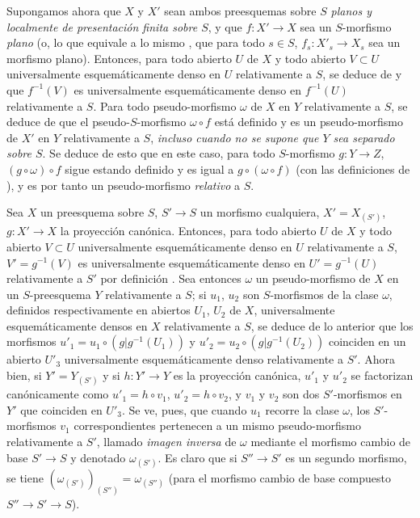 \begin{env}[20.5.7]
\label{IV.20.5.7}
Supongamos ahora que $X$ y $X'$ sean ambos preesquemas sobre $S$ \emph{planos y localmente de presentación finita sobre $S$}, y que $f:X'\to X$ sea un $S$-morfismo \emph{plano} (o, lo que equivale a lo mismo , que para todo $s\in S$, $f_s:X'_s\to X_s$ sea un morfismo plano).
Entonces, para todo abierto $U$ de $X$ y todo abierto $V\subset U$ universalmente esquemáticamente denso en $U$ relativamente a $S$, se deduce de  y  que $f^{-1}(V)$ es universalmente esquemáticamente denso en $f^{-1}(U)$ relativamente a $S$.
Para todo pseudo-morfismo $\omega$ de $X$ en $Y$ relativamente a $S$, se deduce de  que el pseudo-$S$-morfismo $\omega\circ f$ está definido y es un pseudo-morfismo de $X'$ en $Y$ relativamente a $S$, \emph{incluso cuando no se supone que $Y$ sea separado sobre $S$}.
Se deduce de esto que en este caso, para todo $S$-morfismo $g:Y\to Z$, $(g\circ\omega)\circ f$ sigue estando definido y es igual a $g\circ(\omega\circ f)$ (con las definiciones de ), y es por tanto un pseudo-morfismo \emph{relativo} a $S$.
\end{env}

\begin{env}[20.5.8]
\label{IV.20.5.8}
Sea $X$ un preesquema sobre $S$, $S'\to S$ un morfismo cualquiera, $X'=X_{(S')}$, $g:X'\to X$ la proyección canónica.
Entonces, para todo abierto $U$ de $X$ y todo abierto $V\subset U$ universalmente esquemáticamente denso en $U$ relativamente a $S$, $V'=g^{-1}(V)$ es universalmente esquemáticamente denso en $U'=g^{-1}(U)$ relativamente a $S'$ por definición .
Sea entonces $\omega$ un pseudo-morfismo de $X$ en un $S$-preesquema $Y$ relativamente a $S$; si $u_1$, $u_2$ son $S$-morfismos de la clase $\omega$, definidos respectivamente en abiertos $U_1$, $U_2$ de $X$, universalmente esquemáticamente densos en $X$ relativamente a $S$, se deduce de lo anterior que los morfismos $u'_1=u_1\circ(g|g^{-1}(U_1))$ y $u'_2=u_2\circ(g|g^{-1}(U_2))$ coinciden en un abierto $U'_3$ universalmente esquemáticamente denso relativamente a $S'$.
Ahora bien, si $Y'=Y_{(S')}$ y si $h:Y'\to Y$ es la proyección canónica, $u'_1$ y $u'_2$ se factorizan canónicamente como $u'_1=h\circ v_1$, $u'_2=h\circ v_2$, y $v_1$ y $v_2$ son dos $S'$-morfismos en $Y'$ que coinciden en $U'_3$.
Se ve, pues, que cuando $u_1$ recorre la clase $\omega$, los $S'$-morfismos $v_1$ correspondientes pertenecen a un mismo pseudo-morfismo relativamente a $S'$, llamado \emph{imagen inversa} de $\omega$ mediante el morfismo cambio de base $S'\to S$ y denotado $\omega_{(S')}$.
Es claro que si $S''\to S'$ es un segundo morfismo, se tiene $(\omega_{(S')})_{(S'')}=\omega_{(S'')}$ (para el morfismo cambio de base compuesto $S''\to S'\to S$).
\end{env}

